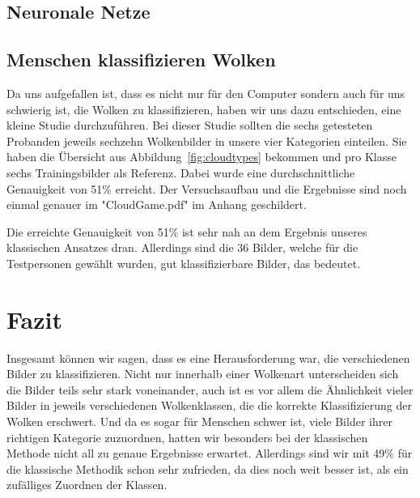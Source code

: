 \documentclass[a4,german]{article}
\begin{document}
\subsection{Neuronale Netze}


\subsection{Menschen klassifizieren Wolken}

Da uns aufgefallen ist, dass es nicht nur für den Computer sondern auch für uns schwierig ist, die Wolken zu klassifizieren, haben wir uns dazu entschieden, eine kleine Studie durchzuführen.
Bei dieser Studie sollten die sechs getesteten Probanden jeweils sechzehn Wolkenbilder in unsere vier Kategorien einteilen.
Sie haben die Übersicht aus Abbildung~\ref{fig:cloudtypes} bekommen und pro Klasse sechs Trainingsbilder als Referenz.
Dabei wurde eine durchschnittliche Genauigkeit von 51\% erreicht. Der Versuchsaufbau und die Ergebnisse sind noch einmal genauer im "CloudGame.pdf" im Anhang geschildert.

Die erreichte Genauigkeit von 51\% ist sehr nah an dem Ergebnis unseres klassischen Ansatzes dran. Allerdings sind die 36 Bilder, welche für die Testpersonen gewählt wurden, gut klassifizierbare Bilder, das bedeutet.

\section{Fazit}
\label{sec:fazit}


Insgesamt können wir sagen, dass es eine Herausforderung war, die verschiedenen Bilder zu klassifizieren.
Nicht nur innerhalb einer Wolkenart unterscheiden sich die Bilder teils sehr stark voneinander, auch ist es vor allem die Ähnlichkeit vieler Bilder in jeweils verschiedenen Wolkenklassen, die die korrekte Klassifizierung der Wolken erschwert.
Und da es sogar für Menschen schwer ist, viele Bilder ihrer richtigen Kategorie zuzuordnen, hatten wir besonders bei der klassischen Methode nicht all zu genaue Ergebnisse erwartet.
Allerdings sind wir mit 49\% für die klassische Methodik schon sehr zufrieden, da dies noch weit besser ist, als ein zufälliges Zuordnen der Klassen.
\end{document}
